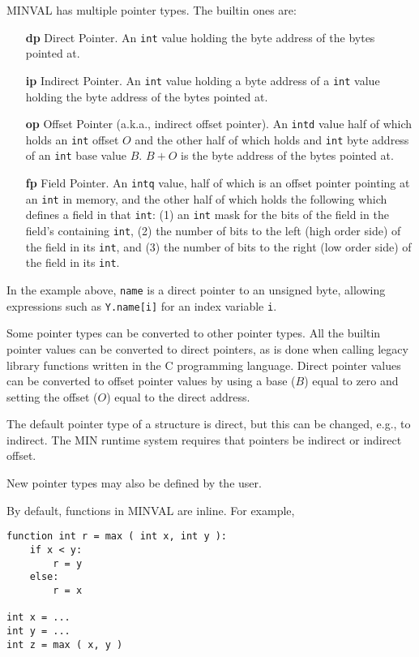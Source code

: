 \documentclass[12pt]{article}
\newenvironment{indpar}[1][0.3in]%
	{\begin{list}{}%
		     {\setlength{\itemsep}{0in}%
		      \setlength{\topsep}{0in}%
		      \setlength{\parsep}{1ex}%
		      \setlength{\labelwidth}{#1}%
		      \setlength{\leftmargin}{#1}%
		      \addtolength{\leftmargin}{\labelsep}}%
	 \item}%
	{\end{list}}
\begin{document}
MINVAL has multiple pointer types.  The builtin ones are:
\begin{itemize}
\item[{\bf dp}] Direct Pointer.  An {\tt int} value holding
the byte address of the bytes pointed at.
\item[{\bf ip}] Indirect Pointer.  An {\tt int} value holding
a byte address of a {\tt int} value holding the byte address
of the bytes pointed at.
\item[{\bf op}] Offset Pointer (a.k.a., indirect offset pointer).
An {\tt intd} value half of which holds an {\tt int} offset $O$ and
the other half of which holds and {\tt int}
byte address of an {\tt int} base value $B$.  $B+O$ is the byte
address of the bytes pointed at.
\item[{\bf fp}] Field Pointer.  An {\tt intq} value, half of
which is an offset pointer pointing at an {\tt int} in memory,
and the other half of which holds the following which defines a field in that
{\tt int}: (1) an {\tt int} mask for
the bits of the field in the field's containing {\tt int},
(2) the number of bits to the left (high order side) of the field in
its {\tt int}, and
(3) the number of bits to the right (low order side) of the field in
its {\tt int}.

\end{itemize}

In the example above, {\tt name} is a direct pointer to an unsigned
byte, allowing expressions such as {\tt Y.name[i]} for an index variable
{\tt i}.

Some pointer types can be converted to other pointer types.
All the builtin pointer values can be converted to direct
pointers, as is done when calling legacy library functions
written in the C programming language.  Direct pointer values
can be converted to offset pointer values by using a base ($B$)
equal to zero and setting the offset ($O$) equal to the
direct address.

The default pointer type of a structure is direct, but this
can be changed, e.g., to indirect.  The MIN runtime system
requires that pointers be indirect or indirect offset.

New pointer types may also be defined by the user.

By default, functions in MINVAL are inline.  For example,

\begin{indpar}\begin{verbatim}
function int r = max ( int x, int y ):
    if x < y:
        r = y
    else:
        r = x

int x = ...
int y = ...
int z = max ( x, y )
\end{verbatim}\end{indpar}
\end{document}
